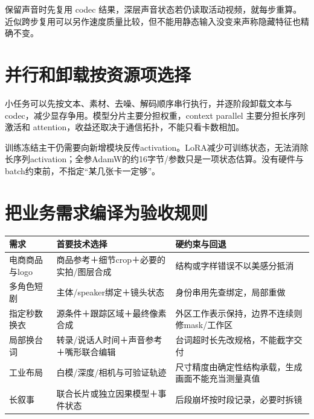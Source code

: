 保留声音时先复用 codec 结果，深层声音状态若仍读取活动视频，就每步重算。近似跨步复用可以另作速度质量比较，但不能用静态输入没变来声称隐藏特征也精确不变。

\section{并行和卸载按资源项选择}\label{seedance-m26-ux5e76ux884cux548cux5378ux8f7dux6309ux8d44ux6e90ux9879ux9009ux62e9}

小任务可以先按文本、素材、去噪、解码顺序串行执行，并逐阶段卸载文本与 codec，减少显存争用。模型分片主要分担权重，context parallel 主要分担长序列激活和 attention，收益还取决于通信拓扑，不能只看卡数相加。

训练冻结主干仍需要向新增模块反传activation。LoRA减少可训练状态，无法消除长序列activation；全参AdamW的约16字节/参数只是一项状态估算。没有硬件与batch约束前，不指定``某几张卡一定够''。

\section{把业务需求编译为验收规则}\label{seedance-m26-ux628aux4e1aux52a1ux9700ux6c42ux7f16ux8bd1ux4e3aux9a8cux6536ux89c4ux5219}

{\def\LTcaptype{table} %
\small\setlength{\tabcolsep}{3pt}\renewcommand{\arraystretch}{1.18}
\begin{longtable}[]{@{}
  >{\raggedright\arraybackslash}p{}
  >{\raggedright\arraybackslash}p{}
  >{\raggedright\arraybackslash}p{}@{}}
\toprule\noalign{}
\begin{minipage}[b]{\linewidth}\raggedright
需求
\end{minipage} & \begin{minipage}[b]{\linewidth}\raggedright
首要技术选择
\end{minipage} & \begin{minipage}[b]{\linewidth}\raggedright
硬约束与回退
\end{minipage} \\
\midrule\noalign{}
\endhead
\bottomrule\noalign{}
\endlastfoot
电商商品与logo & 商品参考＋细节crop＋必要的实拍/图层合成 & 结构或字样错误不以美感分抵消 \\
多角色短剧 & 主体/speaker绑定＋镜头状态 & 身份串用先查绑定，局部重做 \\
指定秒数换衣 & 源条件＋跟踪区域＋最终像素合成 & 外区工作表示保持，边界不连续则修mask/工作区 \\
局部换台词 & 转录/说话人时间＋声音参考＋嘴形联合编辑 & 台词超时长先改规格，不能截字交付 \\
工业布局 & 白模/深度/相机与可验证轨迹 & 尺寸精度由确定性结构承载，生成画面不能充当测量真值 \\
长叙事 & 联合长片或独立因果模型＋事件状态 & 后段崩坏按时段记录，必要时拆镜 \\
\end{longtable}
}

